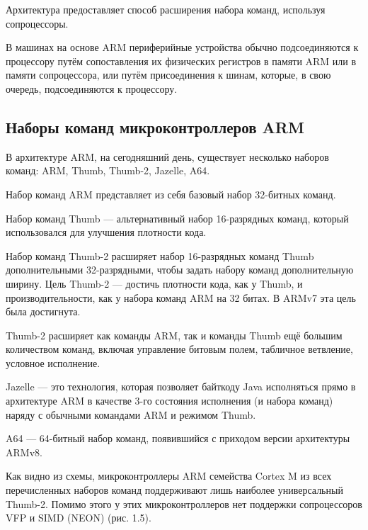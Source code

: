 \documentclass[12pt, oneside]{altsu-report}
\begin{document}
Архитектура предоставляет способ расширения набора команд, используя сопроцессоры.

В машинах на основе ARM периферийные устройства обычно подсоединяются к процессору путём сопоставления их физических регистров в памяти ARM или в памяти сопроцессора, или путём присоединения к шинам, которые, в свою очередь, подсоединяются к процессору.

\subsection{Наборы команд микроконтроллеров ARM}

В архитектуре ARM, на сегодняшний день, существует несколько наборов команд: ARM, Thumb, Thumb-2, Jazelle, A64.

Набор команд ARM представляет из себя базовый набор 32-битных команд.

Набор команд Thumb --- альтернативный набор 16-разрядных команд, который использовался для улучшения плотности кода.

Набор команд Thumb-2 расширяет набор 16-разрядных команд Thumb дополнительными 32-разрядными, чтобы задать набору команд дополнительную ширину. Цель Thumb-2 --- достичь плотности кода, как у Thumb, и производительности, как у набора команд ARM на 32 битах. В ARMv7 эта цель была достигнута.

Thumb-2 расширяет как команды ARM, так и команды Thumb ещё большим количеством команд, включая управление битовым полем, табличное ветвление, условное исполнение.

Jazelle --- это технология, которая позволяет байткоду Java исполняться прямо в архитектуре ARM в качестве 3-го состояния исполнения (и набора команд) наряду с обычными командами ARM и режимом Thumb.

A64 --- 64-битный набор команд, появившийся с приходом версии архитектуры ARMv8.

Как видно из схемы, микроконтроллеры ARM семейства Cortex M из всех перечисленных наборов команд поддерживают лишь наиболее универсальный Thumb-2. Помимо этого у этих микроконтроллеров нет поддержки сопроцессоров VFP и SIMD (NEON) (рис. 1.5).
\end{document}

